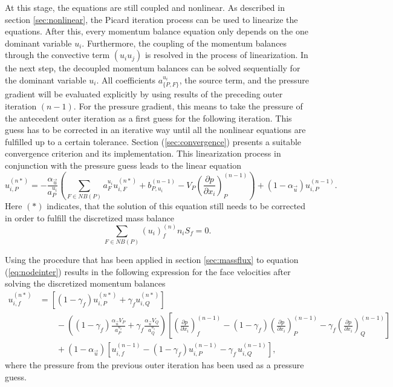 At this stage, the equations are still coupled and nonlinear. As described in section \ref{sec:nonlinear}, the Picard iteration process can be used to linearize the equations. After this, every momentum balance equation only depends on the one dominant variable \(u_i\). Furthermore, the coupling of the momentum balances through the convective term \((u_i u_j)\) is resolved in the process of linearization. In the next step, the decoupled momentum balances can be solved sequentially for the dominant variable \(u_i\). All coefficients \(a_{\{P,F\}}^{u_i}\), the source term, and the pressure gradient will be evaluated explicitly by using results of the preceding outer iteration \((n-1)\). For the pressure gradient, this means to take the pressure of the antecedent outer iteration as a first guess for the following iteration. This guess has to be corrected in an iterative way until all the nonlinear equations are fulfilled up to a certain tolerance. Section (\ref{sec:convergence}) presents a suitable convergence criterion and its implementation. This linearization process in conjunction with the pressure guess leads to the linear equation 
\begin{equation}
  \label{eq:nodeinter}
  u_{i,P}^{(n*)} 
  = 
  - \frac{\alpha_{\vec{u}}}{a_P^{u_i}} \left(\sum_{F \in NB(P)} a_F^{u_i} u_{i,F}^{(n*)}
  +                                     b_{P,u_i}^{(n-1)} 
  -                                     V_P\left(\frac{\partial p}{\partial x_i}\right)_P^{(n-1)} \right)
  + \left(1 - \alpha_{\vec{u}}\right) u_{i,P}^{(n-1)}.
\end{equation}
Here \((*)\) indicates, that the solution of this equation still needs to be corrected in order to fulfill the discretized mass balance
\begin{equation}
  \label{eq:contisemi}
  \sum_{F \in NB(P)} (u_i)_f^{(n)} n_i S_f = 0.
\end{equation}

Using the procedure that has been applied in section \ref{sec:massflux} to equation (\ref{eq:nodeinter}) results in the following expression for the face velocities after solving the discretized momentum balances 
\begin{align}
  \label{eq:faceinter}
  u_{i,f}^{(n*)} 
  &=
  \left[\left(1 - \gamma_f\right) u_{i,P}^{(n*)} + \gamma_f u_{i,Q}^{(n*)} \right] \nonumber \\[1em]
  &\quad\quad - 
  \left(\left(1 - \gamma_f\right) \frac{\alpha_\vec{u} V_P}{a_P^{u_i}} + \gamma_f \frac{\alpha_\vec{u} V_Q}{a_Q^{u_i}}\right)
  \left[ 
  \left(\frac{\partial p}{\partial x_i}\right)_f^{(n-1)} 
  - \left( 1 - \gamma_f \right) \left( \frac{\partial p}{\partial x_i} \right)_P^{(n-1)} 
  - \gamma_f \left(\frac{\partial p}{\partial x_i}\right)_Q^{(n-1)}
  \right] \nonumber \\[1em]
  &\quad\quad + \left(1 - \alpha_\vec{u}\right) \left[ u_{i,f}^{(n-1)} - \left(1 - \gamma_f\right) u_{i,P}^{(n-1)} - \gamma_f \, u_{i,Q}^{(n-1)} \right],
\end{align}
where the pressure from the previous outer iteration has been used as a pressure guess.

